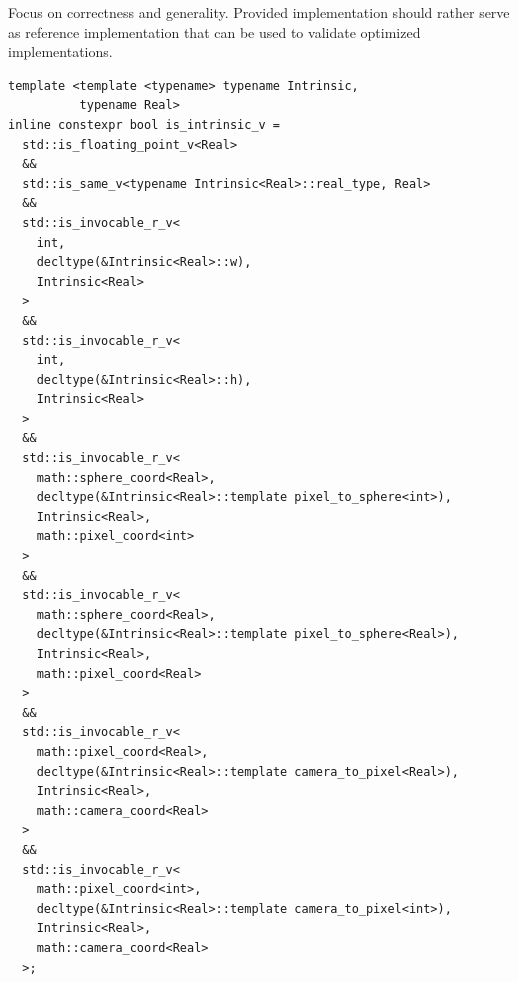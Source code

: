 Focus on correctness and generality.
Provided implementation should rather serve as reference implementation that can be used to validate optimized implementations.

\begin{lstlisting}
template <template <typename> typename Intrinsic,
          typename Real>
inline constexpr bool is_intrinsic_v =
  std::is_floating_point_v<Real>
  &&
  std::is_same_v<typename Intrinsic<Real>::real_type, Real>
  &&
  std::is_invocable_r_v<
    int,
    decltype(&Intrinsic<Real>::w),
    Intrinsic<Real>
  >
  &&
  std::is_invocable_r_v<
    int,
    decltype(&Intrinsic<Real>::h),
    Intrinsic<Real>
  >
  &&
  std::is_invocable_r_v<
    math::sphere_coord<Real>,
    decltype(&Intrinsic<Real>::template pixel_to_sphere<int>),
    Intrinsic<Real>,
    math::pixel_coord<int>
  >
  &&
  std::is_invocable_r_v<
    math::sphere_coord<Real>,
    decltype(&Intrinsic<Real>::template pixel_to_sphere<Real>),
    Intrinsic<Real>,
    math::pixel_coord<Real>
  >
  &&
  std::is_invocable_r_v<
    math::pixel_coord<Real>,
    decltype(&Intrinsic<Real>::template camera_to_pixel<Real>),
    Intrinsic<Real>,
    math::camera_coord<Real>
  >
  &&
  std::is_invocable_r_v<
    math::pixel_coord<int>,
    decltype(&Intrinsic<Real>::template camera_to_pixel<int>),
    Intrinsic<Real>,
    math::camera_coord<Real>
  >;
\end{lstlisting}

